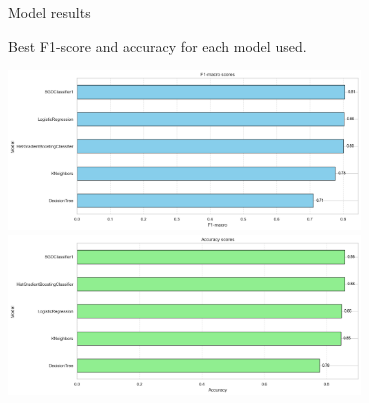\begin{frame}{Model results}


    \begin{center}
    {\footnotesize Best F1-score and accuracy for each model used.}
    
    \includegraphics[width=0.7\textwidth]{images/f1model.png}
    \includegraphics[width=0.7\textwidth]{images/accmodel.png}
    \end{center}


\end{frame}

